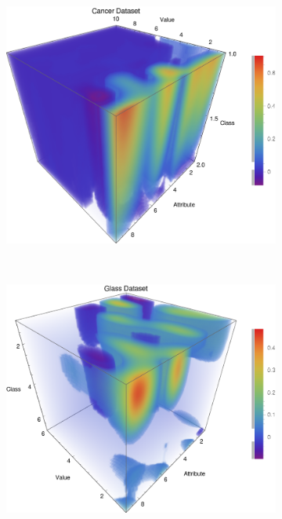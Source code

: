 \documentclass{article}
\begin{document}
			\begin{figure}[h]
				\centering
				\begin{subfigure}[b]{0.49\textwidth}
					\centering
					\includegraphics[width=\textwidth]{figs/NaiveBayes/plot_ptable_cancer}					
				\end{subfigure}	\	
				\begin{subfigure}[b]{0.49\textwidth}
					\centering
					\includegraphics[width=\textwidth]{figs/NaiveBayes/plot_ptable_glass}					

\end{subfigure}
\end{figure}
\end{document}
